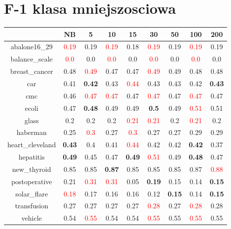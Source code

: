 \documentclass{article}%
\begin{document}
\section*{F{-}1 klasa mniejszosciowa}%
\begin{tabular}{c|cccccccc}%
\hline%
&NB&5&10&15&30&50&100&200\\%
\hline%
abalone16\_29&\textcolor{red}{ 
0.19
}&0.19&\textcolor{red}{ 
0.19
}&0.18&\textcolor{red}{ 
0.19
}&0.19&\textcolor{red}{ 
0.19
}&0.19\\%
\hline%
balance\_scale&\textcolor{red}{ 
0.0
}&0.0&\textcolor{red}{ 
0.0
}&0.0&\textcolor{red}{ 
0.0
}&0.0&\textcolor{red}{ 
0.0
}&0.0\\%
\hline%
breast\_cancer&0.48&\textcolor{red}{ 
0.49
}&0.47&0.47&\textcolor{red}{ 
0.49
}&0.49&0.48&0.48\\%
\hline%
car&0.41&\textbf{0.42}&0.43&\textcolor{red}{ 
0.44
}&0.43&0.43&0.42&\textbf{0.43}\\%
\hline%
cmc&0.46&\textcolor{red}{ 
0.47
}&\textcolor{red}{ 
0.47
}&0.47&\textcolor{red}{ 
0.47
}&0.47&\textcolor{red}{ 
0.47
}&0.47\\%
\hline%
ecoli&0.47&\textbf{0.48}&0.49&0.49&\textbf{0.5}&0.49&\textcolor{red}{ 
0.51
}&0.51\\%
\hline%
glass&0.2&0.2&0.2&\textcolor{red}{ 
0.21
}&\textcolor{red}{ 
0.21
}&0.2&\textcolor{red}{ 
0.21
}&0.2\\%
\hline%
haberman&0.25&\textcolor{red}{ 
0.3
}&0.27&\textcolor{red}{ 
0.3
}&0.27&0.27&0.29&0.29\\%
\hline%
heart\_cleveland&\textbf{0.43}&0.4&0.41&\textcolor{red}{ 
0.44
}&0.42&0.42&\textbf{0.42}&0.37\\%
\hline%
hepatitis&\textbf{0.49}&0.45&0.47&\textbf{0.49}&\textcolor{red}{ 
0.51
}&0.49&\textbf{0.48}&0.47\\%
\hline%
new\_thyroid&0.85&0.85&\textbf{0.87}&0.85&0.85&0.85&0.87&\textcolor{red}{ 
0.88
}\\%
\hline%
postoperative&0.21&\textcolor{red}{ 
0.31
}&\textcolor{red}{ 
0.31
}&0.05&\textbf{0.19}&0.15&0.14&\textbf{0.15}\\%
\hline%
solar\_flare&\textcolor{red}{ 
0.18
}&0.17&0.16&0.16&0.12&\textbf{0.15}&0.14&\textbf{0.15}\\%
\hline%
transfusion&0.27&0.27&0.27&0.27&\textcolor{red}{ 
0.28
}&0.27&\textcolor{red}{ 
0.28
}&0.28\\%
\hline%
vehicle&0.54&\textcolor{red}{ 
0.55
}&0.54&0.54&\textcolor{red}{ 
0.55
}&0.55&\textcolor{red}{ 
0.55
}&0.55\\%

\end{tabular}
\end{document}
